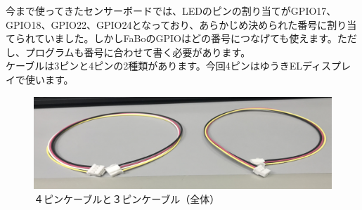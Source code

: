 今まで使ってきたセンサーボードでは、LEDのピンの割り当てがGPIO17、GPIO18、GPIO22、GPIO24となっており、あらかじめ決められた番号に割り当てられていました。しかしFaBoのGPIOはどの番号につなげても使えます。ただし、プログラムも番号に合わせて書く必要があります。\\
ケーブルは3ピンと4ピンの2種類があります。今回4ピンはゆうきELディスプレイで使います。\\
\begin{figure}[h]
  \begin{center}
    \includegraphics[scale=0.6]{images/chap05/text05-img013.png}
    \caption{４ピンケーブルと３ピンケーブル（全体）}
  \end{center}
\end{figure}
